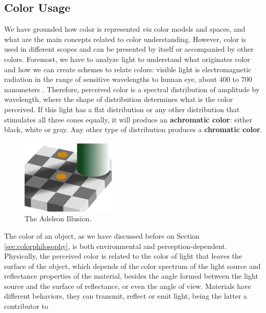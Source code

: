 \documentclass{report}
\begin{document}
\subsection{Color Usage}
We have grounded how color is represented \emph{via} color models and spaces, and what are the main concepts
related to color understanding. However, color is used in different scopes and can be presented by itself or
accompanied by other colors. Foremost, we have to analyze light to understand what originates color and how
we can create schemes to relate colors: visible light is electromagnetic radiation in the range of sensitive 
wavelengths to human eye, about 400 to 700 nanometers \cite{Joblove1978}. Therefore,
perceived color is a spectral distribution of amplitude by wavelength, where the shape of distribution determines
what is the color perceived. If this light has a flat distribution or any other distribution that stimulates all
three cones equally, it will produce an \textbf{achromatic color}: either black, white or gray. Any other type of
distribution produces a \textbf{chromatic color}. \par
%
\begin{figure}
	\centering
    \vspace{-\baselineskip}
    \includegraphics[width=0.4\textwidth]{Adelson_Illusion.jpg}
    \caption[Adelson Illusion]{The Adelson Illusion.\protect\footnotemark{}}
    \label{fig:adelson}
\end{figure}
%
The color of an object, as we have discussed before on Section \ref{sec:colorphilosophy}, is both environmental and
perception-dependent. Physically, the perceived color is related to the color of light that leaves the surface
of the object, which depends of the color spectrum of the light source and reflectance properties of the material,
besides the angle formed between the light source and the surface of reflectance, or even the angle of view.
Materials have different behaviors, they can transmit, reflect or emit light, being the latter a contributor to
\end{document}
